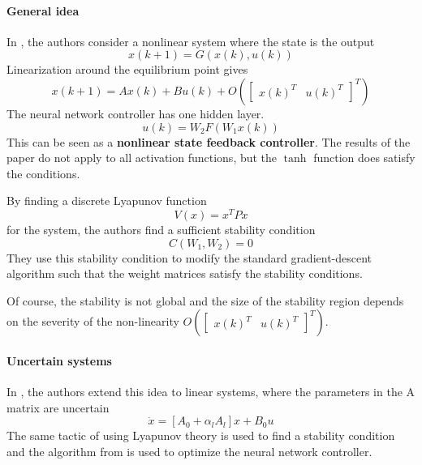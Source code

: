 \paragraph{General idea}
In \cite{modified_SGD_for_neural_network_control}, the authors consider a nonlinear system where the state is the output
\begin{equation*}
    x(k+1) = G(x(k),u(k))
\end{equation*}
Linearization around the equilibrium point gives 
\begin{equation*}
    x(k+1) = A x(k) + B u(k) + O(\begin{bmatrix} x(k)^T & u(k)^T \end{bmatrix}^T)
\end{equation*}
The neural network controller has one hidden layer.
\begin{equation*}
    u(k) = W_2 F (W_1 x(k))
\end{equation*}
This can be seen as a \textbf{nonlinear state feedback controller}. The results of the paper do not apply to all activation functions, but the $\tanh$ function does satisfy the conditions. 

By finding a discrete Lyapunov function
\begin{equation*}
    V(x) = x^T P x
\end{equation*}
for the system, the authors find a sufficient stability condition
\begin{equation*}
    C(W_1,W_2) = 0
\end{equation*}
They use this stability condition to modify the standard gradient-descent algorithm such that the weight matrices satisfy the stability conditions.

Of course, the stability is not global and the size of the stability region depends on the severity of the non-linearity $O(\begin{bmatrix} x(k)^T & u(k)^T \end{bmatrix}^T)$.

\paragraph{Uncertain systems}
In \cite{stability_condition_for_uncertain_systems}, the authors extend this idea to linear systems, where the parameters in the A matrix are uncertain
\begin{equation*}
    \Dot{x} = [A_0 + \alpha_l A_l]x + B_0 u
\end{equation*}
The same tactic of using Lyapunov theory is used to find a stability condition and the algorithm from \cite{modified_SGD_for_neural_network_control} is used to optimize the neural network controller.

